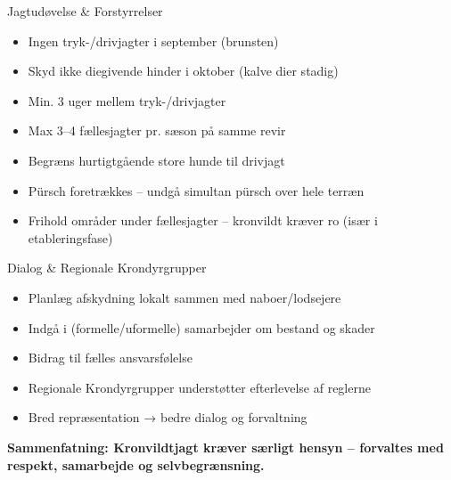 \begin{frame}{Jagtudøvelse \& Forstyrrelser}
\begin{itemize}
\item Ingen tryk-/drivjagter i september (brunsten)
\item Skyd ikke diegivende hinder i oktober (kalve dier stadig)
\item Min. 3 uger mellem tryk-/drivjagter
\item Max 3–4 fællesjagter pr. sæson på samme revir
\item Begræns hurtigtgående store hunde til drivjagt
\item Pürsch foretrækkes – undgå simultan pürsch over hele terræn
\item Frihold områder under fællesjagter – kronvildt kræver ro (især i etableringsfase)
\end{itemize}
\end{frame}

\begin{frame}{Dialog \& Regionale Krondyrgrupper}
\begin{itemize}
\item Planlæg afskydning lokalt sammen med naboer/lodsejere
\item Indgå i (formelle/uformelle) samarbejder om bestand og skader
\item Bidrag til fælles ansvarsfølelse
\item Regionale Krondyrgrupper understøtter efterlevelse af reglerne
\item Bred repræsentation → bedre dialog og forvaltning
\end{itemize}

\bigskip
\textbf{Sammenfatning: Kronvildtjagt kræver særligt hensyn – forvaltes med respekt, samarbejde og selvbegrænsning.}
\end{frame}